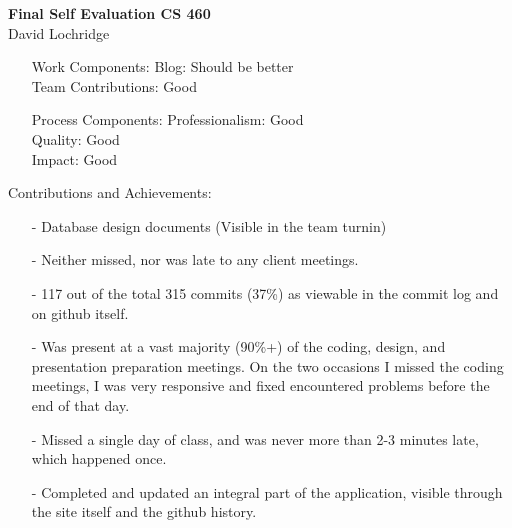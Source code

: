 \documentclass[11pt]{report}
\begin{document}
\begin{center}
	\Large\textbf{Final Self Evaluation CS 460}\\
	\Large{David Lochridge}
\end{center}

\begin{itemize}
\item[Work Components:]
	Blog: Should be better\\
	Team Contributions: Good


\item[Process Components:]
	Professionalism:	Good\\
	Quality:	Good\\
	Impact:	Good
\end{itemize}


Contributions and Achievements:
\begin{itemize}
\item[-] Database design documents (Visible in the team turnin)
\item[-] Neither missed, nor was late to any client meetings.
\item[-] 117 out of the total 315 commits (37\%) as viewable in the commit log and on github itself.
\item[-] Was present at a vast majority (90\%+) of the coding, design, and presentation preparation meetings. On the two occasions I missed the coding meetings, I was very responsive and fixed encountered problems before the end of that day.
\item[-] Missed a single day of class, and was never more than 2-3 minutes late, which happened once.
\item[-] Completed and updated an integral part of the application, visible through the site itself and the github history.
\end{itemize}
\end{document}
